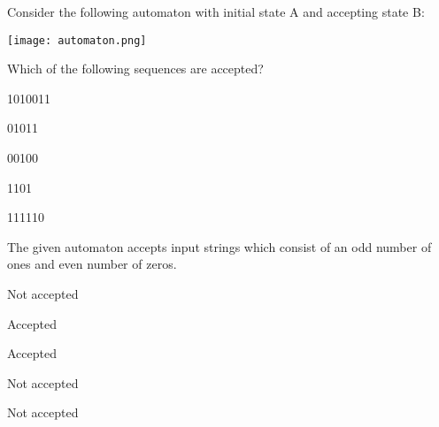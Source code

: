 

\begin{question}

Consider the following automaton with initial state A and accepting state B:

\texttt{[image: automaton.png]}

Which of the following sequences are accepted?

\begin{answerlist}
  \item 1010011
  \item 01011
  \item 00100
  \item 1101
  \item 111110
\end{answerlist}
\end{question}


\begin{solution}

The given automaton accepts input strings which consist of an
odd number of ones and
even number of zeros.

\begin{answerlist}
  \item Not accepted
  \item Accepted
  \item Accepted
  \item Not accepted
  \item Not accepted
\end{answerlist}
\end{solution}


